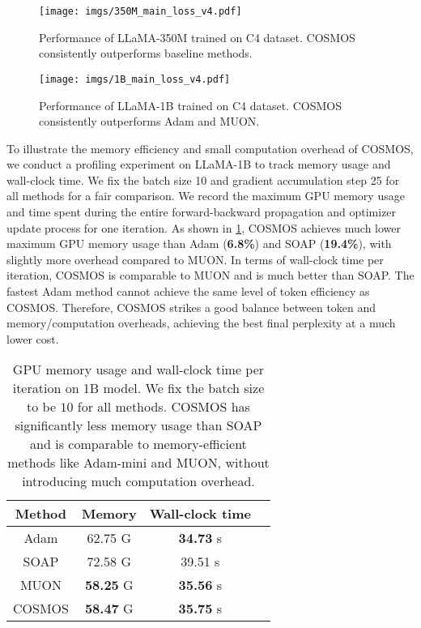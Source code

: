 \begin{figure}[htb!]
    \centering
    \texttt{[image: imgs/350M\_main\_loss\_v4.pdf]}
    \caption{Performance of LLaMA-350M trained on C4 dataset. COSMOS consistently outperforms baseline methods. }
    \label{fig:exp-350m-main}
\end{figure}

\begin{figure}[htb!]
    \centering
    \texttt{[image: imgs/1B\_main\_loss\_v4.pdf]}
    \caption{Performance of LLaMA-1B trained on C4 dataset. COSMOS consistently outperforms Adam and MUON.}
    \label{fig:exp-1b-main}
\end{figure}



\vskip2pt
To illustrate the memory efficiency and small computation overhead of COSMOS, we conduct a profiling experiment on LLaMA-1B to track memory usage and wall-clock time. 
We fix the batch size 10 and gradient accumulation step 25 for all methods for a fair comparison. 
We record the maximum GPU memory usage and time spent during the entire forward-backward propagation and optimizer update process for one iteration. 
As shown in \cref{tab:exp-memory}, COSMOS achieves much lower maximum GPU memory usage than Adam (\textbf{6.8\%}) and SOAP (\textbf{19.4\%}), with slightly more overhead compared to MUON. 
In terms of wall-clock time per iteration, COSMOS is comparable to MUON and is much better than SOAP. 
The fastest Adam method cannot achieve the same level of token efficiency as COSMOS. 
Therefore, COSMOS strikes a good balance between token and memory/computation overheads, achieving the best final perplexity at a much lower cost. 

\begin{table}[htb!]
    \caption{GPU memory usage and wall-clock time per iteration on 1B model. We fix the batch size to be $10$ for all methods. COSMOS has significantly less memory usage than SOAP and is comparable to memory-efficient methods like Adam-mini and MUON, without introducing much computation overhead.}
    \label{tab:exp-memory}
    \centering
    \begin{tabular}{c|ccc}
    \toprule
    Method & Memory & Wall-clock time \\
    \hline
    Adam & 62.75 G &\textbf{34.73} s \\
    SOAP & 72.58 G &39.51 s \\
    MUON & \textbf{58.25} G &\textbf{35.56} s \\
    \hline
    COSMOS &\textbf{58.47} G &\textbf{35.75} s \\
    \bottomrule
    \end{tabular}
\end{table}



